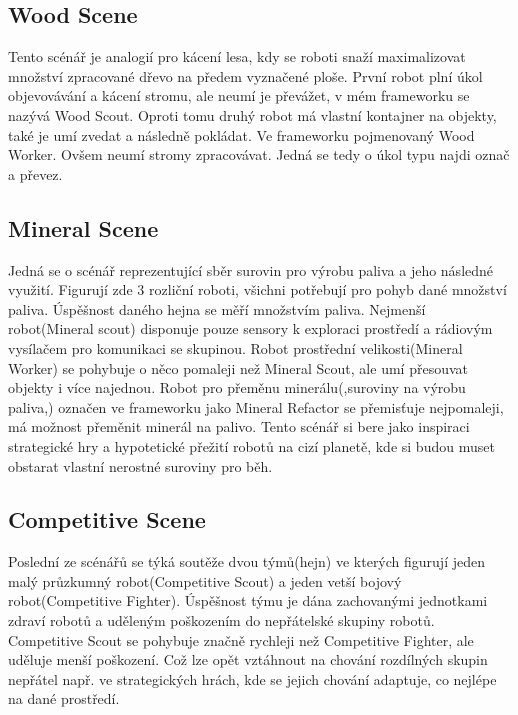 \subsection{Wood Scene}
Tento scénář je analogií pro kácení lesa, kdy se roboti snaží maximalizovat množství zpracované dřevo na předem vyznačené ploše. První robot plní úkol objevovávání a kácení stromu, ale neumí je převážet, v mém frameworku se nazývá Wood Scout. Oproti tomu druhý robot má vlastní kontajner na objekty, také je umí zvedat a následně pokládat. Ve frameworku pojmenovaný Wood Worker. Ovšem neumí stromy zpracovávat. Jedná se tedy o úkol typu najdi označ a převez.
\subsection{Mineral Scene}
Jedná se o scénář reprezentující sběr surovin pro výrobu paliva a jeho následné využití. Figurují zde 3 rozliční roboti, všichni potřebují pro pohyb  dané množství paliva. Úspěšnost daného hejna se měří množstvím paliva. Nejmenší robot(Mineral scout) disponuje pouze sensory k exploraci prostředí a rádiovým vysílačem pro komunikaci se skupinou. Robot prostřední velikosti(Mineral Worker) se pohybuje o něco pomaleji než Mineral Scout, ale umí přesouvat objekty i více najednou. Robot pro přeměnu minerálu(,suroviny na výrobu paliva,) označen ve frameworku jako Mineral Refactor se přemisťuje nejpomaleji, má možnost přeměnit minerál na palivo. Tento scénář si bere jako inspiraci strategické hry a hypotetické přežití robotů na cizí planetě, kde si budou muset obstarat vlastní nerostné suroviny pro běh.
\subsection{Competitive Scene}
Poslední ze scénářů se týká soutěže dvou týmů(hejn) ve kterých figurují jeden malý průzkumný robot(Competitive Scout) a jeden vetší bojový robot(Competitive Fighter). Úspěšnost týmu je dána zachovanými jednotkami zdraví robotů a uděleným poškozením do nepřátelské skupiny robotů. Competitive Scout se pohybuje značně rychleji než Competitive Fighter, ale uděluje menší poškození. Což lze opět vztáhnout na chování rozdílných skupin nepřátel např. ve strategických hrách, kde se jejich chování adaptuje, co nejlépe na dané prostředí. 

